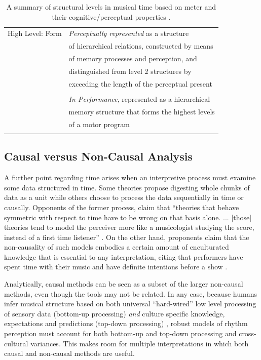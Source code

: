 \begin{table}
\begin{tabular}{|l|l|}
High Level: Form       & {\it Perceptually represented} as a structure\\
                       & of hierarchical relations, constructed by means\\
                       & of memory processes and perception, and \\
                       & distinguished from level 2 structures by \\
                       & exceeding the length of the perceptual present \\
                       &  \\
                       & {\it In Performance}, represented as a hierarchical \\
                       & memory structure that forms the highest levels\\
                       & of a motor program \\
                       & \\ \hline
\end{tabular}
\caption {A summary of structural levels in musical time based on
  meter and their cognitive/perceptual properties \cite[p. 233]{Clarke:87}.}
\end{table}

\vspace{5mm}
\subsection{Causal versus Non-Causal Analysis}
A further point regarding time arises when an interpretive process must
examine some data structured in time. Some theories propose digesting
whole chunks of data as a unit while others choose to process
the data sequentially in time or causally. Opponents of the former
process, claim that ``theories that behave symmetric with respect to 
time have to be wrong on that basis alone. ... [those] theories 
tend to model the perceiver more like a musicologist studying the
score, instead of a first time listener'' \cite{Desain:92}. On the
other hand, proponents claim that the non-causality of such models
embodies a certain amount of enculturated knowledge that is essential to
any interpretation, citing that performers have spent time with their
music and have definite intentions before a show \cite[p. 55]{Smith:99}. 

Analytically, causal methods can be seen as a subset of the larger
non-causal methods, even though the tools may not be related.
In any case, because humans infer musical structure based on
both universal ``hard-wired'' low level processing of sensory data
(bottom-up processing) {\it and} culture specific knowledge,
expectations and predictions (top-down processing)
\cite[p. 27]{Todd:94}, robust models of rhythm perception must account 
for both bottom-up and top-down processing and cross-cultural variances. 
This makes room for multiple interpretations in which both causal and
non-causal methods are useful.


